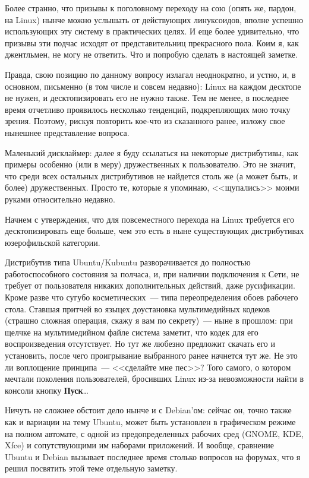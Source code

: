Более странно, что призывы к поголовному переходу на сою (опять же, пардон, на Linux) нынче можно услышать от действующих линуксоидов, вполне успешно использующих эту систему в практических целях. И еще более удивительно, что призывы эти подчас исходят от представительниц прекрасного пола. Коим я, как джентльмен, не могу не ответить. Что и попробую сделать в настоящей заметке.

Правда, свою позицию по данному вопросу излагал неоднократно, и устно, и, в основном, письменно (в том числе и совсем недавно): Linux на каждом десктопе не нужен, и десктопизировать его не нужно также. Тем не менее, в последнее время отчетливо проявилось несколько тенденций, подкрепляющих мою точку зрения. Поэтому, рискуя повторить кое-что из сказанного ранее, изложу свое нынешнее представление вопроса.

Маленький дисклаймер: далее я буду ссылаться на некоторые дистрибутивы, как примеры особенно (или в меру) дружественных к пользователю. Это не значит, что среди всех остальных дистрибутивов не найдется столь же (а может быть, и более) дружественных. Просто те, которые я упоминаю, <<щупались>> моими руками относительно недавно.

Начнем с утверждения, что для повсеместного перехода на Linux требуется его десктопизировать еще больше, чем это есть в ныне существующих дистрибутивах юзерофильской категории.

Дистрибутив типа Ubuntu/Kubuntu разворачивается до полностью работоспособного состояния за полчаса, и, при наличии подключения к Сети, не требует от пользователя никаких дополнительных действий, даже русификации. Кроме разве что сугубо косметических~--- типа переопределения обоев рабочего стола. Ставшая притчей во языцех доустановка мультимедийных кодеков (страшно сложная операция, скажу я вам по секрету)~--- ныне в прошлом: при щелчке на мультимедийном файле система заметит, что кодек для его воспроизведения отсутствует. Но тут же любезно предложит скачать его и установить, после чего проигрывание выбранного ранее начнется тут же. Не это ли воплощение принципа~--- <<сделайте мне пес>>? Того самого, о котором мечтали поколения пользователей, бросивших Linux из-за невозможности найти в консоли кнопку \textbf{Пуск}\dots

Ничуть не сложнее обстоит дело нынче и с Debian'ом: сейчас он, точно также как и вариации на тему Ubuntu, может быть установлен в графическом режиме на полном автомате, с одной из предопределенных рабочих сред (GNOME, KDE, Xfce) и сопутствующими им наборами приложений. И вообще, сравнение Ubuntu и Debian вызывает последнее время столько вопросов на форумах, что я решил посвятить этой теме отдельную заметку.

